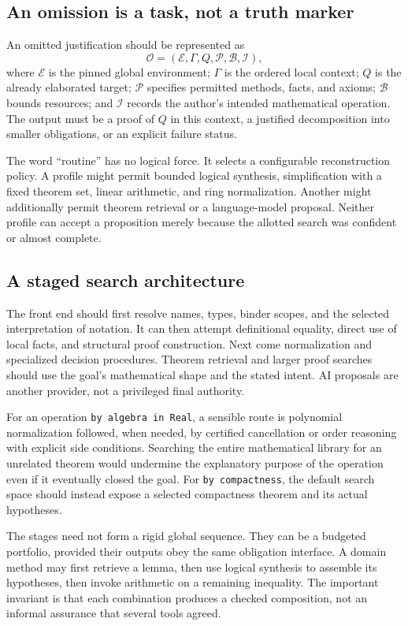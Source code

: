\documentclass[11pt,a4paper]{article}
\newcommand{\code}[1]{\texttt{\small #1}}
\newcommand{\Env}{\mathcal E}
\newcommand{\Ob}{\mathcal O}
\theoremstyle{definition}
\theoremstyle{remark}
\begin{document}
\subsection{An omission is a task, not a truth marker}
An omitted justification should be represented as
\begin{equation}
 \Ob=(\Env,\Gamma,Q,\mathcal P,\mathcal B,\mathcal I),
 \label{eq:obligation}
\end{equation}
where $\Env$ is the pinned global environment; $\Gamma$ is the ordered local context; $Q$ is the already elaborated target; $\mathcal P$ specifies permitted methods, facts, and axioms; $\mathcal B$ bounds resources; and $\mathcal I$ records the author's intended mathematical operation. The output must be a proof of $Q$ in this context, a justified decomposition into smaller obligations, or an explicit failure status.

The word ``routine'' has no logical force. It selects a configurable reconstruction policy. A profile might permit bounded logical synthesis, simplification with a fixed theorem set, linear arithmetic, and ring normalization. Another might additionally permit theorem retrieval or a language-model proposal. Neither profile can accept a proposition merely because the allotted search was confident or almost complete.

\subsection{A staged search architecture}
The front end should first resolve names, types, binder scopes, and the selected interpretation of notation. It can then attempt definitional equality, direct use of local facts, and structural proof construction. Next come normalization and specialized decision procedures. Theorem retrieval and larger proof searches should use the goal's mathematical shape and the stated intent. AI proposals are another provider, not a privileged final authority.

For an operation \code{by algebra in Real}, a sensible route is polynomial normalization followed, when needed, by certified cancellation or order reasoning with explicit side conditions. Searching the entire mathematical library for an unrelated theorem would undermine the explanatory purpose of the operation even if it eventually closed the goal. For \code{by compactness}, the default search space should instead expose a selected compactness theorem and its actual hypotheses.

The stages need not form a rigid global sequence. They can be a budgeted portfolio, provided their outputs obey the same obligation interface. A domain method may first retrieve a lemma, then use logical synthesis to assemble its hypotheses, then invoke arithmetic on a remaining inequality. The important invariant is that each combination produces a checked composition, not an informal assurance that several tools agreed.
\end{document}
